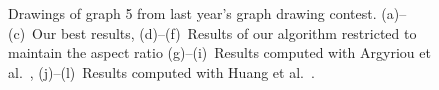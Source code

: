 \documentclass[runningheads]{llncs}
\begin{document}
{\begin{figure}[htbp]
{}
\hfill
{}
\caption{Drawings of graph 5 from last year's graph drawing contest. 
(a)--(c)~Our best results,
(d)--(f)~Results of our algorithm restricted to maintain the aspect ratio 
(g)--(i)~Results computed with Argyriou et al.~\cite{DBLP:journals/cj/ArgyriouBS13}, 
(j)--(l)~Results computed with Huang et al.~\cite{DBLP:journals/vlc/HuangEHL13}.}
\label{fig:graph5}
\end{figure}

\begin{figure}[htbp]
\centering


\end{figure}}
\end{document}
